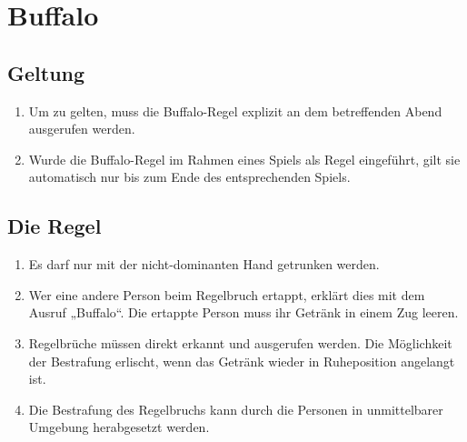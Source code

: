 \chapter{Buffalo}
\section{Geltung}
\begin{enumerate}[label={(\arabic*)}]
    \item
    Um zu gelten, muss die Buffalo-Regel explizit an dem betreffenden Abend ausgerufen werden.

    \item
    Wurde die Buffalo-Regel im Rahmen eines Spiels als Regel eingeführt, gilt sie automatisch nur bis zum Ende des entsprechenden Spiels.
\end{enumerate}

\section{Die Regel}
\begin{enumerate}[label={(\arabic*)}]
    \item
    Es darf nur mit der nicht-dominanten Hand getrunken werden.

    \item
    Wer eine andere Person beim Regelbruch ertappt, erklärt dies mit dem Ausruf „Buffalo“.
    Die ertappte Person muss ihr Getränk in einem Zug leeren.

    \item
    Regelbrüche müssen direkt erkannt und ausgerufen werden.
    Die Möglichkeit der Bestrafung erlischt, wenn das Getränk wieder in Ruheposition angelangt ist.

    \item
    Die Bestrafung des Regelbruchs kann durch die Personen in unmittelbarer Umgebung herabgesetzt werden.
\end{enumerate}
